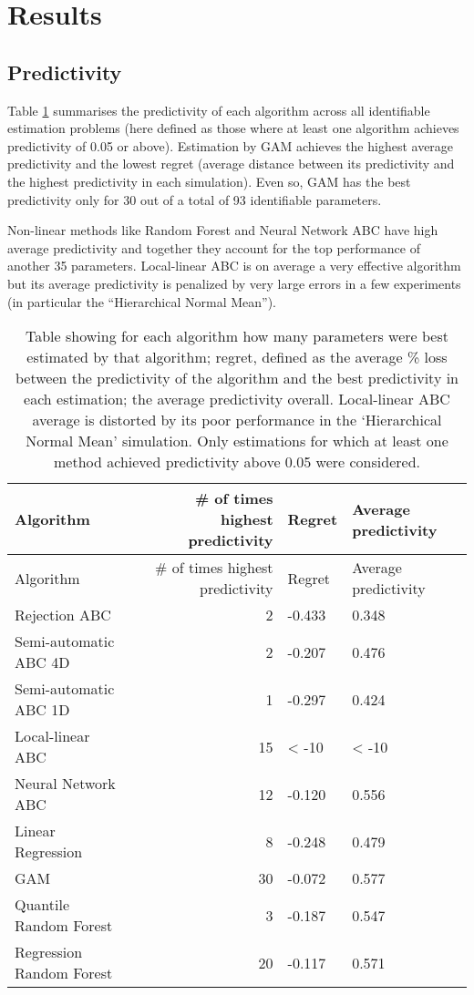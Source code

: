 \documentclass[]{article}
\begin{document}
\hypertarget{results}{%
\section{Results}\label{results}}

\hypertarget{predictivity}{%
\subsection{Predictivity}\label{predictivity}}

Table \ref{tab:predictiontable} summarises the predictivity of each algorithm across all identifiable estimation problems (here defined as those where at least one algorithm achieves predictivity of 0.05 or above).
Estimation by GAM achieves the highest average predictivity and the lowest regret (average distance between its predictivity and the highest predictivity in each simulation). Even so, GAM has the best predictivity only for 30 out of a total of 93 identifiable parameters.

Non-linear methods like Random Forest and Neural Network ABC have high average predictivity and together they account for the top performance of another 35 parameters.
Local-linear ABC is on average a very effective algorithm but its average predictivity is penalized by very large errors in a few experiments (in particular the ``Hierarchical Normal Mean'').

\begin{longtable}[]{@{}lrll@{}}
\caption{\label{tab:predictiontable}Table showing for each algorithm how many parameters were best estimated by that algorithm; regret, defined as the average \% loss between the predictivity of the algorithm and the best predictivity in each estimation; the average predictivity overall. Local-linear ABC average is distorted by its poor performance in the `Hierarchical Normal Mean' simulation. Only estimations for which at least one method achieved predictivity above 0.05 were considered.}\tabularnewline
\toprule
Algorithm & \# of times highest predictivity & Regret & Average predictivity\tabularnewline
\midrule
\endfirsthead
\toprule
Algorithm & \# of times highest predictivity & Regret & Average predictivity\tabularnewline
\midrule
\endhead
Rejection ABC & 2 & -0.433 & 0.348\tabularnewline
Semi-automatic ABC 4D & 2 & -0.207 & 0.476\tabularnewline
Semi-automatic ABC 1D & 1 & -0.297 & 0.424\tabularnewline
Local-linear ABC & 15 & \textless{} -10 & \textless{} -10\tabularnewline
Neural Network ABC & 12 & -0.120 & 0.556\tabularnewline
Linear Regression & 8 & -0.248 & 0.479\tabularnewline
GAM & 30 & -0.072 & 0.577\tabularnewline
Quantile Random Forest & 3 & -0.187 & 0.547\tabularnewline
Regression Random Forest & 20 & -0.117 & 0.571\tabularnewline
\bottomrule
\end{longtable}
\end{document}
